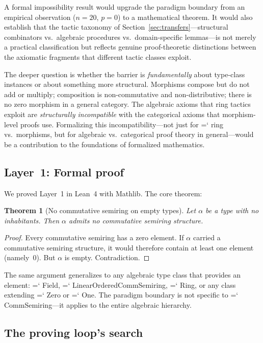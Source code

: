 \documentclass[11pt]{article}
\renewcommand{\texttt}[1]{%
  \begingroup\ttfamily\hyphenchar\font=`\-\relax
  \def\_{\textunderscore\discretionary{}{}{}}%
  #1\endgroup}
\newtheorem{theorem}{Theorem}
\theoremstyle{definition}
\theoremstyle{remark}
\begin{document}
A formal impossibility result would upgrade the paradigm boundary
from an empirical observation ($n = 20$, $p = 0$) to a mathematical
theorem.  It would also establish that the tactic taxonomy of
Section~\ref{sec:transfers}---structural combinators vs.\ algebraic
procedures vs.\ domain-specific lemmas---is not merely a practical
classification but reflects genuine proof-theoretic distinctions
between the axiomatic fragments that different tactic classes exploit.

The deeper question is whether the barrier is \emph{fundamentally}
about type-class instances or about something more structural.
Morphisms compose but do not add or multiply; composition is
non-commutative and non-distributive; there is no zero morphism in a
general category.  The algebraic axioms that ring tactics exploit are
\emph{structurally incompatible} with the categorical axioms that
morphism-level proofs use.  Formalizing this incompatibility---not
just for \texttt{ring} vs.\ morphisms, but for algebraic vs.\
categorical proof theory in general---would be a contribution to
the foundations of formalized mathematics.

\subsection{Layer~1: Formal proof}

We proved Layer~1 in Lean~4 with Mathlib.  The core theorem:

\begin{theorem}[No commutative semiring on empty types]%
\label{thm:paradigm}
Let $\alpha$ be a type with no inhabitants.  Then $\alpha$ admits no
commutative semiring structure.
\end{theorem}

\begin{proof}
Every commutative semiring has a zero element.  If $\alpha$ carried
a commutative semiring structure, it would therefore contain at
least one element (namely~$0$).  But $\alpha$ is empty.
Contradiction.
\end{proof}

\noindent The same argument generalizes to any algebraic type class
that provides an element: \texttt{Field}, \texttt{LinearOrdered\-CommSemiring},
\texttt{Ring}, or any class extending \texttt{Zero} or \texttt{One}.
The paradigm boundary is not specific to \texttt{CommSemiring}---it
applies to the entire algebraic hierarchy.

\subsection{The proving loop's search}
\end{document}
